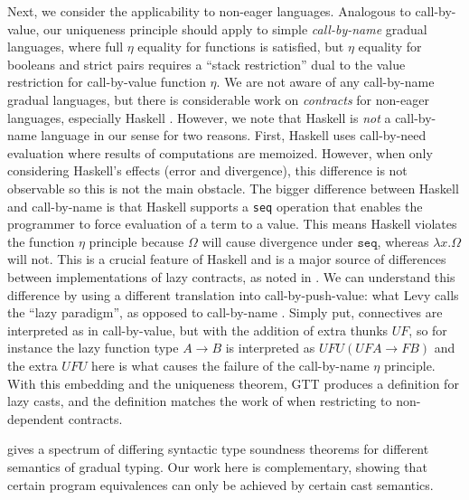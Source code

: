 \documentclass[acmsmall,screen,12pt]{acmart}
\newif\iflong
\newcommand{\seq}{\texttt{seq}}
\begin{document}
{Next, we consider the applicability to non-eager languages.
%
Analogous to call-by-value, our uniqueness principle should apply to
simple \emph{call-by-name} gradual languages, where full $\eta$
equality for functions is satisfied, but $\eta$ equality for booleans
and strict pairs requires a ``stack restriction'' dual to the value
restriction for call-by-value function $\eta$.
%
We are not aware of any call-by-name gradual languages, but there is
considerable work on \emph{contracts} for non-eager languages,
especially Haskell \cite{hinzeJeuringLoh06,XuPJC09}.
%
However, we note that Haskell is \emph{not} a call-by-name language in
our sense for two reasons.
%
First, Haskell uses call-by-need evaluation where results of
computations are memoized. However, when only considering Haskell's
effects (error and divergence), this difference is not observable so
this is not the main obstacle.
%
The bigger difference between Haskell and call-by-name is that Haskell
supports a \texttt{seq} operation that enables the programmer to force
evaluation of a term to a value.
%
This means Haskell violates the function $\eta$ principle because
$\Omega$ will cause divergence under $\seq$, whereas $\lambda
x. \Omega$ will not.
%
This is a crucial feature of Haskell and is a major source of
differences between implementations of lazy contracts, as noted in
\citet{Degen2012TheIO}.
%
We can understand this difference by using a different translation
into call-by-push-value: what Levy calls the ``lazy paradigm'', as
opposed to call-by-name \cite{levy03cbpvbook}.
%
Simply put, connectives are interpreted as in call-by-value, but with
the addition of extra thunks $UF$, so for instance the lazy function
type $A \to B$ is interpreted as $UFU(UFA \to FB)$ and the extra $UFU$
here is what causes the failure of the call-by-name $\eta$ principle.
%
With this embedding and the uniqueness theorem, GTT produces a
definition for lazy casts, and the definition matches the work of
\citet{XuPJC09} when restricting to non-dependent contracts.

\iflong\paragraph{Comparing Soundness Principles for Cast Semantics}\fi
\citet{greenmanfelleisen:2018} gives a spectrum of
differing syntactic type soundness theorems for different semantics of
gradual typing.
%
Our work here is complementary, showing that certain program
equivalences can only be achieved by certain cast semantics.

}
\end{document}

